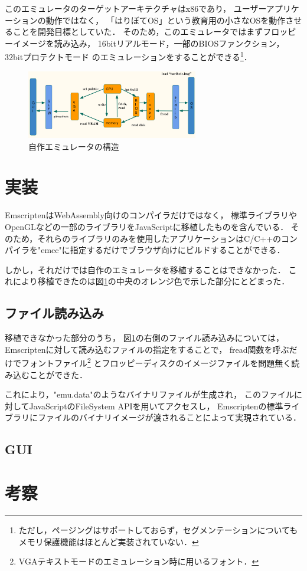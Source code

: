 \documentclass[a4j,10pt]{jsarticle}
\begin{document}
このエミュレータのターゲットアーキテクチャはx86であり，
ユーザーアプリケーションの動作ではなく，
「はりぼてOS」という教育用の小さなOSを動作させることを開発目標としていた．
そのため，このエミュレータではまずフロッピーイメージを読み込み，
16bitリアルモード，一部のBIOSファンクション，32bitプロテクトモード
のエミュレーションをすることができる\footnote{ただし，ページングはサポートしておらず，セグメンテーションについてもメモリ保護機能はほとんど実装されていない．}．

\begin{figure}[htbp]
	\begin{center}
		\includegraphics[width=7.5cm]{./emu_struct.png}
		\caption{自作エミュレータの構造}
		\label{emustruct}
	\end{center}
\end{figure}

\section{実装}
EmscriptenはWebAssembly向けのコンパイラだけではなく，
標準ライブラリやOpenGLなどの一部のライブラリをJavaScriptに移植したものを含んでいる．
そのため，それらのライブラリのみを使用したアプリケーションはC/C++のコンパイラを"emcc"に指定するだけでブラウザ向けにビルドすることができる．

しかし，それだけでは自作のエミュレータを移植することはできなかった．
これにより移植できたのは図\ref{emustruct}の中央のオレンジ色で示した部分にとどまった．

\subsection{ファイル読み込み}
移植できなかった部分のうち，
図\ref{emustruct}の右側のファイル読み込みについては，
Emscriptenに対して読み込むファイルの指定をすることで，
fread関数を呼ぶだけでフォントファイル\footnote{VGAテキストモードのエミュレーション時に用いるフォント．}
とフロッピーディスクのイメージファイルを問題無く読み込むことができた．

これにより，"emu.data"のようなバイナリファイルが生成され，
このファイルに対してJavaScriptのFileSystem APIを用いてアクセスし，
Emscriptenの標準ライブラリにファイルのバイナリイメージが渡されることによって実現されている．

\subsection{GUI}

\section{考察}



\end{document}
